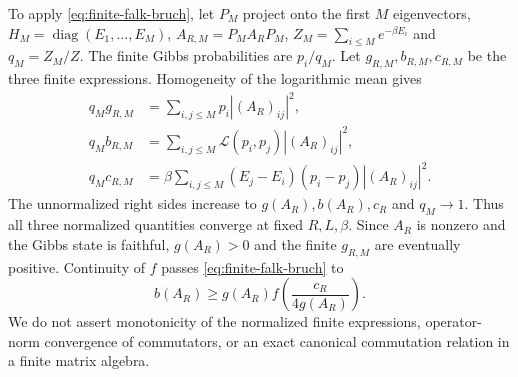 \documentclass[11pt]{article}
\numberwithin{equation}{section}
\theoremstyle{definition}
\begin{document}
To apply \eqref{eq:finite-falk-bruch}, let $P_M$ project onto the first
$M$ eigenvectors, $H_M=\operatorname{diag}(E_1,\ldots,E_M)$,
$A_{R,M}=P_M A_R P_M$, $Z_M=\sum_{i\leq M}e^{-\beta E_i}$ and
$q_M=Z_M/Z$.  The finite Gibbs probabilities are $p_i/q_M$.
Let $g_{R,M},b_{R,M},c_{R,M}$ be the three finite expressions.  Homogeneity
of the logarithmic mean gives
\begin{align}
 q_M g_{R,M}&=\sum_{i,j\leq M}p_i|(A_R)_{ij}|^2,\nonumber\\
 q_M b_{R,M}&=\sum_{i,j\leq M}\mathcal L(p_i,p_j)|(A_R)_{ij}|^2,\nonumber\\
 q_M c_{R,M}&=\beta\sum_{i,j\leq M}(E_j-E_i)(p_i-p_j)|(A_R)_{ij}|^2.
 \label{eq:collective-spectral-cutoff}
\end{align}
The unnormalized right sides increase to $g(A_R),b(A_R),c_R$ and
$q_M\to1$.  Thus all three normalized quantities converge at fixed
$R,L,\beta$.  Since $A_R$ is nonzero and the Gibbs state is faithful,
$g(A_R)>0$ and the finite $g_{R,M}$ are eventually positive.  Continuity
of $f$ passes \eqref{eq:finite-falk-bruch} to
\begin{equation}
 b(A_R)\geq g(A_R)f\left(\frac{c_R}{4g(A_R)}\right).
 \label{eq:collective-bounded-falk}
\end{equation}
We do not assert monotonicity of the normalized finite expressions,
operator-norm convergence of commutators, or an exact canonical commutation
relation in a finite matrix algebra.
\end{document}
